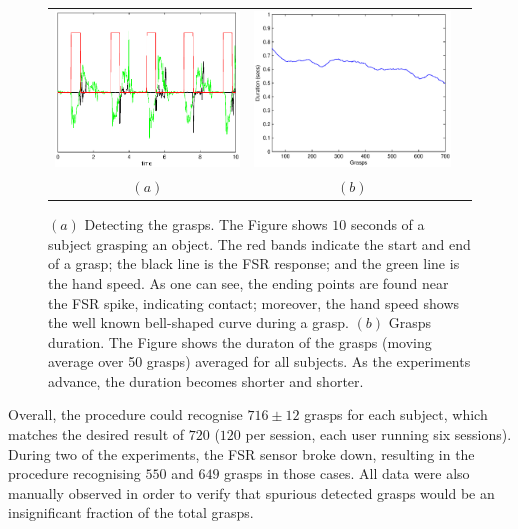 \begin{figure}[htbp]
  \begin{center}
    \begin{tabular}{ccc}
      \includegraphics[width=0.48\linewidth]{grasp_seq_scotch.eps} &
      \includegraphics[width=0.48\linewidth]{grasp_trend.eps} \\
      $(a)$ & $(b)$
    \end{tabular}
    \caption{$(a)$ Detecting the grasps. The Figure shows $10$ seconds
    of a subject grasping an object. The red bands indicate the start
    and end of a grasp; the black line is the FSR response; and the
    green line is the hand speed. As one can see, the ending points
    are found near the FSR spike, indicating contact; moreover, the
    hand speed shows the well known bell-shaped curve during a
    grasp. $(b)$ Grasps duration. The Figure shows the duraton of the
    grasps (moving average over 50 grasps) averaged for all
    subjects. As the experiments advance, the duration becomes shorter
    and shorter.}
    \label{fig:grasp_sequence}
  \end{center}
\end{figure}

Overall, the procedure could recognise $716 \pm 12$ grasps for each
subject, which matches the desired result of $720$ ($120$ per session,
each user running six sessions). During two of the experiments, the
FSR sensor broke down, resulting in the procedure recognising $550$
and $649$ grasps in those cases. All data were also manually observed
in order to verify that spurious detected grasps would be an
insignificant fraction of the total grasps.


